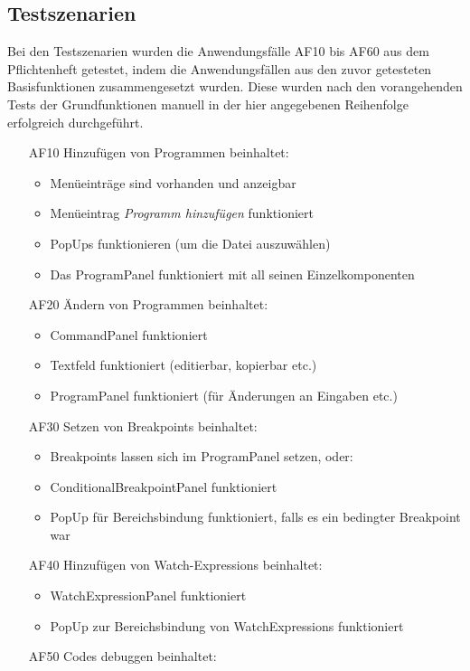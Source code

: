 \documentclass[parskip=full]{scrartcl}
\begin{document}
\label{testszenarien}
\subsection{Testszenarien}
Bei den Testszenarien wurden die Anwendungsfälle AF10 bis AF60 aus dem Pflichtenheft getestet, indem die Anwendungsfällen aus den zuvor getesteten Basisfunktionen zusammengesetzt wurden. Diese wurden nach den vorangehenden Tests der Grundfunktionen manuell in der hier angegebenen Reihenfolge erfolgreich durchgeführt.
\begin{itemize} 
	\item[AF10] Hinzufügen von Programmen beinhaltet: 
	\begin{itemize}
		\item Menüeinträge sind vorhanden und anzeigbar
		\item Menüeintrag \textit{Programm hinzufügen} funktioniert
		\item PopUps funktionieren (um die Datei auszuwählen)
		\item Das ProgramPanel funktioniert mit all seinen Einzelkomponenten
	\end{itemize}
	\item[AF20] Ändern von Programmen beinhaltet:
	\begin{itemize}
		\item CommandPanel funktioniert
		\item Textfeld funktioniert (editierbar, kopierbar etc.)
		\item ProgramPanel funktioniert (für Änderungen an Eingaben etc.)
	\end{itemize}
	\item[AF30] Setzen von Breakpoints beinhaltet:
	\begin{itemize}
		\item Breakpoints lassen sich im ProgramPanel setzen, oder:
		\item ConditionalBreakpointPanel funktioniert
		\item PopUp für Bereichsbindung funktioniert, falls es ein bedingter Breakpoint war
	\end{itemize}
	\item[AF40] Hinzufügen von Watch-Expressions beinhaltet:
	\begin{itemize}
		\item WatchExpressionPanel funktioniert
		\item PopUp zur Bereichsbindung von WatchExpressions funktioniert
	\end{itemize}
	\item[AF50] Codes debuggen beinhaltet:

\end{itemize}
\end{document}
